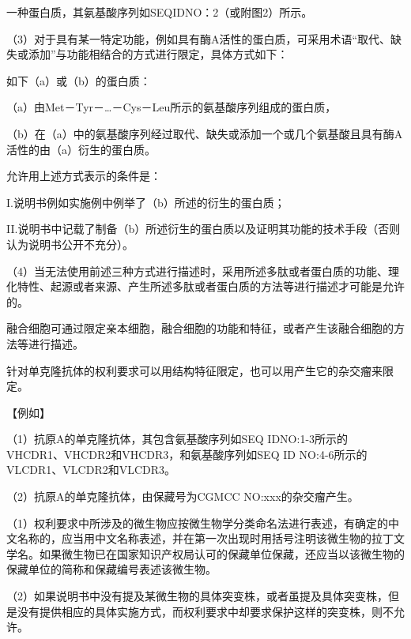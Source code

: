 一种蛋白质，其氨基酸序列如SEQIDNO：2（或附图2）所示。

{\setlength{\parindent}{17.1bp}（3）对于具有某一特定功能，例如具有酶A活性的蛋白质，可采用术语“取代、缺失或添加”与功能相结合的方式进行限定，具体方式如下：\par}

如下（a）或（b）的蛋白质：

{\setlength{\parindent}{17.1bp}（a）由Met－Tyr－…－Cys－Leu所示的氨基酸序列组成的蛋白质，\par}

{\setlength{\parindent}{17.1bp}（b）在（a）中的氨基酸序列经过取代、缺失或添加一个或几个氨基酸且具有酶A活性的由（a）衍生的蛋白质。\par}

允许用上述方式表示的条件是：

I.说明书例如实施例中例举了（b）所述的衍生的蛋白质；

II.说明书中记载了制备（b）所述衍生的蛋白质以及证明其功能的技术手段（否则认为说明书公开不充分）。

{\setlength{\parindent}{17.1bp}（4）当无法使用前述三种方式进行描述时，采用所述多肽或者蛋白质的功能、理化特性、起源或者来源、产生所述多肽或者蛋白质的方法等进行描述才可能是允许的。\par}

融合细胞可通过限定亲本细胞，融合细胞的功能和特征，或者产生该融合细胞的方法等进行描述。

针对单克隆抗体的权利要求可以用结构特征限定，也可以用产生它的杂交瘤来限定。

{\kaiti 【例如】}

（1）抗原A的单克隆抗体，其包含氨基酸序列如SEQ IDNO:1-3所示的VHCDR1、VHCDR2和VHCDR3，和氨基酸序列如SEQ ID NO:4-6所示的VLCDR1、VLCDR2和VLCDR3。

（2）抗原A的单克隆抗体，由保藏号为CGMCC NO:xxx的杂交瘤产生。

{\setlength{\parindent}{17.1bp}（1）权利要求中所涉及的微生物应按微生物学分类命名法进行表述，有确定的中文名称的，应当用中文名称表述，并在第一次出现时用括号注明该微生物的拉丁文学名。如果微生物已在国家知识产权局认可的保藏单位保藏，还应当以该微生物的保藏单位的简称和保藏编号表述该微生物。\par}

{\setlength{\parindent}{17.1bp}（2）如果说明书中没有提及某微生物的具体突变株，或者虽提及具体突变株，但是没有提供相应的具体实施方式，而权利要求中却要求保护这样的突变株，则不允许。\par}

